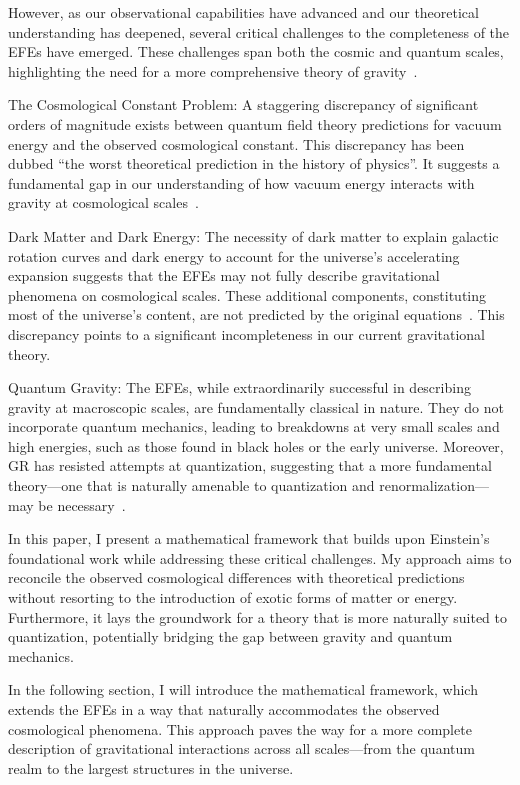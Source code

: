 \documentclass[aps,prd,preprint]{revtex4-1}
\begin{document}
However, as our observational capabilities have advanced and our theoretical understanding has deepened, several critical challenges to the completeness of the EFEs have emerged. These challenges span both the cosmic and quantum scales, highlighting the need for a more comprehensive theory of gravity~\cite{brandes_2013}.

The Cosmological Constant Problem: A staggering discrepancy of significant orders of magnitude exists between quantum field theory predictions for vacuum energy and the observed cosmological constant. This discrepancy has been dubbed ``the worst theoretical prediction in the history of physics''. It suggests a fundamental gap in our understanding of how vacuum energy interacts with gravity at cosmological scales~\cite{weinberg_1989,hobson_2006}.

Dark Matter and Dark Energy: The necessity of dark matter to explain galactic rotation curves and dark energy to account for the universe's accelerating expansion suggests that the EFEs may not fully describe gravitational phenomena on cosmological scales. These additional components, constituting most of the universe's content, are not predicted by the original equations~\cite{bertone_2018,frieman_2008}. This discrepancy points to a significant incompleteness in our current gravitational theory.

Quantum Gravity: The EFEs, while extraordinarily successful in describing gravity at macroscopic scales, are fundamentally classical in nature. They do not incorporate quantum mechanics, leading to breakdowns at very small scales and high energies, such as those found in black holes or the early universe. Moreover, GR has resisted attempts at quantization, suggesting that a more fundamental theory—one that is naturally amenable to quantization and renormalization—may be necessary~\cite{wald_1984,rovelli_2004,hawking_1973}.

In this paper, I present a mathematical framework that builds upon Einstein's foundational work while addressing these critical challenges. My approach aims to reconcile the observed cosmological differences with theoretical predictions without resorting to the introduction of exotic forms of matter or energy. Furthermore, it lays the groundwork for a theory that is more naturally suited to quantization, potentially bridging the gap between gravity and quantum mechanics.

In the following section, I will introduce the mathematical framework, which extends the EFEs in a way that naturally accommodates the observed cosmological phenomena. This approach paves the way for a more complete description of gravitational interactions across all scales—from the quantum realm to the largest structures in the universe.
\end{document}
